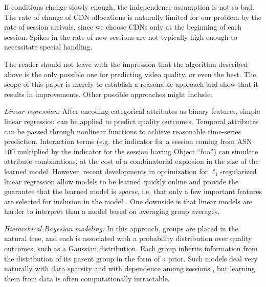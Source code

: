 If conditions change slowly enough, the independence assumption is not so bad.
The rate of change of CDN allocations is naturally limited for our problem by the rate of session arrivals, since we choose CDNs only at the beginning of each session.  Spikes in the rate of new sessions are not typically high enough to necessitate special handling.  

The reader should not leave with the impression that the algorithm described above is the only possible one for predicting video quality, or even the best.  The scope of this paper is merely to establish a reasonable approach and show that it results in improvements.  Other possible approaches might include:
\begin{packedenumerate}
  \item \emph{Linear regression:} After encoding categorical attributes as binary features, simple linear regression can be applied to predict quality outcomes.  Temporal attributes can be passed through nonlinear functions to achieve reasonable time-series prediction.  Interaction terms (e.g. the indicator for a session coming from ASN $100$ multiplied by the indicator for the session having Object ``foo'') can simulate attribute combinations, at the cost of a combinatorial explosion in the size of the learned model.  However, recent developments in optimization for $\ell_1$-regularized linear regression allow models to be learned quickly online and provide the guarantee that the learned model is \emph{sparse}, i.e. that only a few important features are selected for inclusion in the model \cite{duchi2010composite}.  One downside is that linear models are harder to interpret than a model based on averaging group averages.
  \item \emph{Hierarchical Bayesian modeling:} In this approach, groups are placed in the natural tree, and each is associated with a probability distribution over quality outcomes, such as a Gaussian distribution.  Each group inherits information from the distribution of its parent group in the form of a prior.  Such models deal very naturally with data sparsity and with dependence among sessions \cite{gelman2003bayesian}, but learning them from data is often computationally intractable.
\end{packedenumerate}